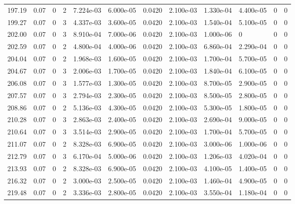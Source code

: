 \documentclass[preview]{standalone}
\begin{document}
{{{{{{\begin{tabular}{L{1.2cm}C{1.2cm} C{0.3cm}C{0.5cm} C{1.4cm}C{1.4cm} C{1.4cm}C{1.4cm} C{1.6cm}C{1.6cm} C{1.6cm}C{1.6cm}}
  197.19  &  0.07  & 0     &  2 &  7.224e-03  & 6.000e-05  &  0.0420&   2.100e-03& 1.330e-04 & 4.400e-05   &  0 & 0  \\ 
  199.27  &  0.07  & 0     &  3 &  4.337e-03  & 3.600e-05  &  0.0420&   2.100e-03& 1.540e-04 & 5.100e-05   &  0 & 0  \\ 
  202.00  &  0.07  & 0     &  3 &  8.910e-04  & 7.000e-06  &  0.0420&   2.100e-03& 1.000e-06 & 0   &  0 & 0  \\ 
  202.59  &  0.07  & 0     &  2 &  4.800e-04  & 4.000e-06  &  0.0420&   2.100e-03& 6.860e-04 & 2.290e-04   &  0 & 0  \\ 
  204.04  &  0.07  & 0     &  2 &  1.968e-03  & 1.600e-05  &  0.0420&   2.100e-03& 1.700e-04 & 5.700e-05   &  0 & 0  \\ 
  204.67  &  0.07  & 0     &  3 &  2.006e-03  & 1.700e-05  &  0.0420&   2.100e-03& 1.840e-04 & 6.100e-05   &  0 & 0  \\ 
  206.08  &  0.07  & 0     &  3 &  1.577e-03  & 1.300e-05  &  0.0420&   2.100e-03& 8.700e-05 & 2.900e-05   &  0 & 0  \\ 
  207.57  &  0.07  & 0     &  3 &  2.794e-03  & 2.300e-05  &  0.0420&   2.100e-03& 8.500e-05 & 2.800e-05   &  0 & 0  \\ 
  208.86  &  0.07  & 0     &  2 &  5.136e-03  & 4.300e-05  &  0.0420&   2.100e-03& 5.300e-05 & 1.800e-05   &  0 & 0  \\ 
  210.28  &  0.07  & 0     &  3 &  2.863e-03  & 2.400e-05  &  0.0420&   2.100e-03& 2.690e-04 & 9.000e-05   &  0 & 0  \\ 
  210.64  &  0.07  & 0     &  3 &  3.514e-03  & 2.900e-05  &  0.0420&   2.100e-03& 1.700e-04 & 5.700e-05   &  0 & 0  \\ 
  211.07  &  0.07  & 0     &  2 &  8.328e-03  & 6.900e-05  &  0.0420&   2.100e-03& 3.000e-06 & 1.000e-06   &  0 & 0  \\ 
  212.79  &  0.07  & 0     &  3 &  6.170e-04  & 5.000e-06  &  0.0420&   2.100e-03& 1.206e-03 & 4.020e-04   &  0 & 0  \\ 
  213.93  &  0.07  & 0     &  2 &  8.328e-03  & 6.900e-05  &  0.0420&   2.100e-03& 4.100e-05 & 1.400e-05   &  0 & 0  \\ 
  216.32  &  0.07  & 0     &  2 &  3.000e-03  & 2.500e-05  &  0.0420&   2.100e-03& 1.460e-04 & 4.900e-05   &  0 & 0  \\ 
  219.48  &  0.07  & 0     &  2 &  3.336e-03  & 2.800e-05  &  0.0420&   2.100e-03& 3.550e-04 & 1.180e-04   &  0 & 0  \\ 
\hline 
\end{tabular} 

}}}}}}
\end{document}
